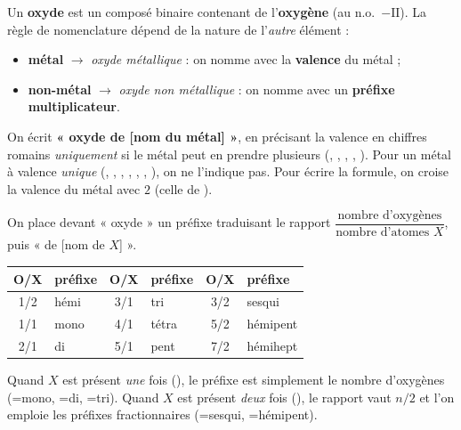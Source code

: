 \documentclass[11pt,a4paper]{article}
\begin{document}

\begin{cle}
Un \textbf{oxyde} est un composé binaire contenant de l'\textbf{oxygène} (au n.o.\ $-\mathrm{II}$). La règle
de nomenclature dépend de la nature de l'\emph{autre} élément :
\begin{itemize}[leftmargin=1.5em,topsep=2pt,itemsep=1pt]
  \item \textbf{métal} $\to$ \emph{oxyde métallique} : on nomme avec la \textbf{valence} du métal ;
  \item \textbf{non-métal} $\to$ \emph{oxyde non métallique} : on nomme avec un \textbf{préfixe multiplicateur}.
\end{itemize}
\end{cle}

\begin{methode}
On écrit \textbf{« oxyde de [nom du métal] »}, en précisant la valence en chiffres romains
\emph{uniquement} si le métal peut en prendre plusieurs (, , , , ).
Pour un métal à valence \emph{unique} (, , , , , , ), on
ne l'indique pas. Pour écrire la formule, on croise la valence du métal avec $2$ (celle de ).
\end{methode}

\begin{methode}[oxyde non métallique : préfixe $=$ rapport O/X]
On place devant « oxyde » un préfixe traduisant le rapport $\dfrac{\text{nombre d'oxygènes}}{\text{nombre d'atomes }X}$,
puis « de [nom de $X$] ».
\begin{center}\footnotesize
\renewcommand{\arraystretch}{1.05}
\begin{tabular}{cl@{\qquad}cl@{\qquad}cl}
\toprule
O/X & préfixe & O/X & préfixe & O/X & préfixe \\
\midrule
1/2 & hémi   & 3/1 & tri   & 3/2 & sesqui \\
1/1 & mono   & 4/1 & tétra & 5/2 & hémipent \\
2/1 & di     & 5/1 & pent  & 7/2 & hémihept \\
\bottomrule
\end{tabular}
\end{center}
Quand $X$ est présent \emph{une} fois (), le préfixe est simplement le nombre d'oxygènes
(=mono, =di, =tri). Quand $X$ est présent \emph{deux} fois (), le rapport
vaut $n/2$ et l'on emploie les préfixes fractionnaires (=sesqui, =hémipent).
\end{methode}
\end{document}
